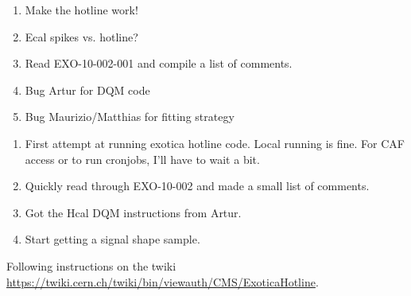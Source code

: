 

\begin{enumerate}
\item Make the hotline work!
\item Ecal spikes vs. hotline?
\item Read EXO-10-002-001 and compile a list of comments.
\item Bug Artur for DQM code
\item Bug Maurizio/Matthias for fitting strategy
\end{enumerate}


\begin{enumerate}
\item First attempt at running exotica hotline code.  Local running is fine.  For CAF access or to run cronjobs, I'll have to wait a bit.
\item Quickly read through EXO-10-002 and made a small list of comments.
\item Got the Hcal DQM instructions from Artur.
\item Start getting a signal shape sample.
\end{enumerate}


Following instructions on the twiki \url{https://twiki.cern.ch/twiki/bin/viewauth/CMS/ExoticaHotline}.

